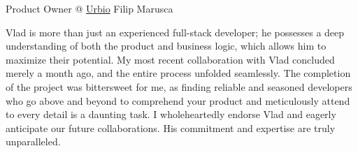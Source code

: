\begin{cventries}
  \cventry
    {Product Owner @ \href{https://urb.io}{Urbio}} %
    {Filip Marusca} %
    {} %
    {} %
    {
      \begin{cvitems} %
        Vlad is more than just an experienced full-stack developer; he possesses a deep understanding of both the product and business logic, which allows him to maximize their potential. My most recent collaboration with Vlad concluded merely a month ago, and the entire process unfolded seamlessly. The completion of the project was bittersweet for me, as finding reliable and seasoned developers who go above and beyond to comprehend your product and meticulously attend to every detail is a daunting task. I wholeheartedly endorse Vlad and eagerly anticipate our future collaborations. His commitment and expertise are truly unparalleled.
      \end{cvitems}
    }

\end{cventries}
